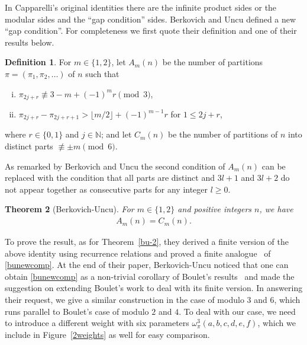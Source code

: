 \documentclass[12pt]{amsart}
\numberwithin{equation}{section}
\theoremstyle{plain}
\newtheorem{theorem}{Theorem}[section]
\theoremstyle{definition}
\newtheorem{Def}[theorem]{Definition}
\newcommand{\N}{\mathbb{N}}
\begin{document}
In Capparelli's original identities there are the 
 infinite product sides or the modular sides and the ``gap condition'' sides.
 Berkovich and Uncu \cite{bu1}  defined  a new ``gap condition''. 
For completeness we first quote their definition and one of their results below.
\begin{Def}
\label{level3}
For $m\in\{1,2\}$, let $A_m(n)$ be the number of partitions $\pi=(\pi_1,\pi_2,\ldots)$ of $n$ such that
\begin{enumerate}[i.]
\item $\pi_{2j+r}\not\equiv 3-m+(-1)^mr \pmod 3$, 
\item $\pi_{2j+r}-\pi_{2j+r+1}>\lfloor m/2\rfloor+(-1)^{m-1}r$ for $1\leq 2j+r$,
\end{enumerate}
where $r\in \{0,1\}$ and $j\in \N$; and
let $C_m(n)$ be the number of partitions of $n$ into distinct parts $\not\equiv \pm m\pmod{6}$.
\end{Def}
As remarked by Berkovich and Uncu \cite{bu1} the second condition of $A_m(n)$  can be replaced with the condition that 
all parts are distinct and $3l+1$ and $3l+2$ do not appear together as consecutive parts for any integer $l\geq 0$.
\begin{theorem}[Berkovich-Uncu]\label{bu-A=C}
For $m\in \{1,2\}$ and positive integers $n$, we have 
\begin{align}\label{bunewcomp}
A_m(n)=C_m(n).
\end{align}
\end{theorem}
To prove the result,  as for Theorem~\ref{bu-2}, they derived a finite version of the above identity using recurrence relations and 
proved a finite analogue~\cite[Theorem 2.5]{bu1} of \eqref{bunewcomp}.
At the end of their paper, Berkovich-Uncu noticed  that  one can obtain \eqref{bunewcomp} as a non-trivial 
corollary of Boulet's results~\cite{bou} and made the suggestion on extending Boulet's 
work \cite{bou} to deal with its finite version. In answering their request, we give a similar construction in the case of modulo $3$ and $6$, which runs parallel to Boulet's case of modulo $2$ and $4$. To deal with our case, we need to introduce a different weight with six parameters $\omega^3_{\pi}(a,b,c,d,e,f)$, which we include in Figure~\ref{2weights} as well for easy comparison.
\end{document}
